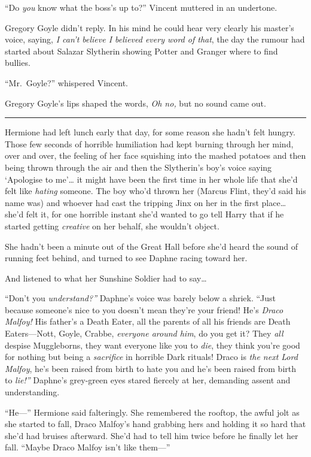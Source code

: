 ``Do \emph{you} know what the boss's up to?'' Vincent muttered in an
undertone.

Gregory Goyle didn't reply. In his mind he could hear very clearly his
master's voice, saying, \emph{I can't believe I believed every word of
that}, the day the rumour had started about Salazar Slytherin showing
Potter and Granger where to find bullies.

``Mr.~Goyle?'' whispered Vincent.

Gregory Goyle's lips shaped the words, \emph{Oh no,} but no sound came
out.

\begin{center}\rule{3in}{0.4pt}\end{center}

Hermione had left lunch early that day, for some reason she hadn't felt
hungry. Those few seconds of horrible humiliation had kept burning
through her mind, over and over, the feeling of her face squishing into
the mashed potatoes and then being thrown through the air and then the
Slytherin's boy's voice saying `Apologise to me'\ldots{} it might have
been the first time in her whole life that she'd felt like \emph{hating}
someone. The boy who'd thrown her (Marcus Flint, they'd said his name
was) and whoever had cast the tripping Jinx on her in the first
place\ldots{} she'd felt it, for one horrible instant she'd wanted to go
tell Harry that if he started getting \emph{creative} on her behalf, she
wouldn't object.

She hadn't been a minute out of the Great Hall before she'd heard the
sound of running feet behind, and turned to see Daphne racing toward
her.

And listened to what her Sunshine Soldier had to say\ldots{}

``Don't you \emph{understand?''} Daphne's voice was barely below a
shriek. ``Just because someone's nice to you doesn't mean they're your
friend! He's \emph{Draco Malfoy!} His father's a Death Eater, all the
parents of all his friends are Death Eaters---Nott, Goyle, Crabbe,
\emph{everyone around him}, do you get it? They \emph{all} despise
Muggleborns, they want everyone like you to \emph{die}, they think
you're good for nothing but being a \emph{sacrifice} in horrible Dark
rituals! Draco is \emph{the next Lord Malfoy}, he's been raised from
birth to hate you and he's been raised from birth to \emph{lie!''}
Daphne's grey-green eyes stared fiercely at her, demanding assent and
understanding.

``He---'' Hermione said falteringly. She remembered the rooftop, the
awful jolt as she started to fall, Draco Malfoy's hand grabbing hers and
holding it so hard that she'd had bruises afterward. She'd had to tell
him twice before he finally let her fall. ``Maybe Draco Malfoy isn't
like them---''

